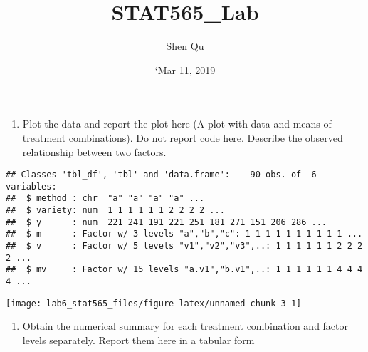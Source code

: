 \documentclass[]{article}
\title{STAT565\_Lab}
\author{Shen Qu}
\date{`Mar 11, 2019}
\providecommand{\tightlist}{%
  \setlength{\itemsep}{0pt}\setlength{\parskip}{0pt}}
\begin{document}
\maketitle

\begin{enumerate}
\def\labelenumi{(\alph{enumi})}
\tightlist
\item
  \textcolor[rgb]{0.5,0.5,0.5}{Plot the data and report the plot here (A plot with data and means of treatment combinations). Do not report code here. Describe the observed relationship between two factors.}
\end{enumerate}

\begin{verbatim}
## Classes 'tbl_df', 'tbl' and 'data.frame':    90 obs. of  6 variables:
##  $ method : chr  "a" "a" "a" "a" ...
##  $ variety: num  1 1 1 1 1 1 2 2 2 2 ...
##  $ y      : num  221 241 191 221 251 181 271 151 206 286 ...
##  $ m      : Factor w/ 3 levels "a","b","c": 1 1 1 1 1 1 1 1 1 1 ...
##  $ v      : Factor w/ 5 levels "v1","v2","v3",..: 1 1 1 1 1 1 2 2 2 2 ...
##  $ mv     : Factor w/ 15 levels "a.v1","b.v1",..: 1 1 1 1 1 1 4 4 4 4 ...
\end{verbatim}

\texttt{[image: lab6\_stat565\_files/figure-latex/unnamed-chunk-3-1]}

\begin{enumerate}
\def\labelenumi{(\alph{enumi})}
\setcounter{enumi}{1}
\tightlist
\item
  \textcolor[rgb]{0.5,0.5,0.5}{Obtain the numerical summary for each treatment combination and factor levels separately. Report them here in a tabular form}
\end{enumerate}
\end{document}

